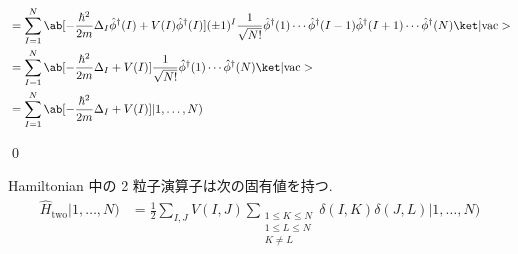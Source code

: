 \documentclass[uplatex,dvipdfmx,a4paper,11pt]{jlreq}
\makeatletter
\numberwithin{equation}{section}
\theoremstyle{definition}
\renewenvironment{proof}[1][\proofname]{\par
  \normalfont
  \topsep6\p@\@plus6\p@ \trivlist
  \item[\hskip\labelsep{\bfseries #1}\@addpunct{\bfseries}]\ignorespaces\quad\par
}{
  \qed\endtrivlist\@endpefalse
}
\renewcommand\proofname{証明}
\makeatother
\begin{document}
\begin{proof}
\begin{align}
     & = \sum_{I = 1}^{N}\ab[-\frac{\hbar^2}{2m}\Delta_{I}\hat{\phi}^\dagger(I) + V(I)\hat{\phi}^\dagger(I)](\pm 1)^{I}\frac{1}{\sqrt{N!}}\hat{\phi}^\dagger(1)\cdots\hat{\phi}^\dagger(I-1)\hat{\phi}^\dagger(I+1)\cdots\hat{\phi}^\dagger(N)\ket|\mathrm{vac}> \\
     & = \sum_{I = 1}^{N}\ab[-\frac{\hbar^2}{2m}\Delta_{I} + V(I)]\frac{1}{\sqrt{N!}}\hat{\phi}^\dagger(1)\cdots\hat{\phi}^\dagger(N)\ket|\mathrm{vac}>                                                                                                          \\
     & = \sum_{I = 1}^{N}\ab[-\frac{\hbar^2}{2m}\Delta_{I} + V(I)]|1,\ldots,N)
  \end{align}
\end{proof}

\begin{lemma}
  Hamiltonian 中の 2 粒子演算子は次の固有値を持つ.
  \begin{align}
    \hat{H}_{\mathrm{two}}|1,\ldots,N) & = \frac{1}{2}\sum_{I,J}V(I, J)\sum_{\substack{1\leq K\leq N \\ 1\leq L\leq N \\ K \neq L}}\delta(I, K)\delta(J, L)|1,\ldots,N)
  \end{align}
\end{lemma}
\end{document}
